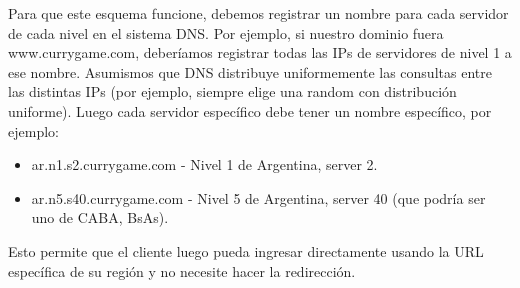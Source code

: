 Para que este esquema funcione, debemos registrar un nombre para cada servidor de cada nivel en
el sistema DNS. Por ejemplo, si nuestro dominio fuera www.currygame.com, deberíamos registrar todas
las IPs de servidores de nivel 1 a ese nombre. Asumismos que DNS distribuye uniformemente
las consultas entre las distintas IPs (por ejemplo, siempre elige una random con distribución uniforme).
Luego cada servidor específico debe tener un nombre específico, por ejemplo:

\begin{itemize}
	\item ar.n1.s2.currygame.com - Nivel 1 de Argentina, server 2.
	\item ar.n5.s40.currygame.com - Nivel 5 de Argentina, server 40 (que podría ser uno de CABA, BsAs).
\end{itemize}

Esto permite que el cliente luego pueda ingresar directamente usando la URL específica de su región
y no necesite hacer la redirección.